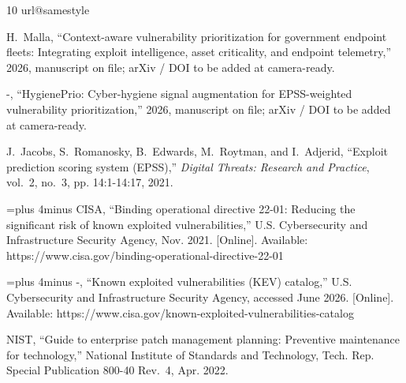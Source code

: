 \documentclass[journal]{IEEEtran}
\begin{document}
\begin{thebibliography}{10}
\providecommand{\url}[1]{#1}
\csname url@samestyle\endcsname
\providecommand{\newblock}{\relax}
\providecommand{\bibinfo}[2]{#2}
\providecommand{\BIBentrySTDinterwordspacing}{\spaceskip=0pt\relax}
\providecommand{\BIBentryALTinterwordstretchfactor}{4}
\providecommand{\BIBentryALTinterwordspacing}{\spaceskip=\fontdimen2\font plus
\BIBentryALTinterwordstretchfactor\fontdimen3\font minus
  \fontdimen4\font\relax}
\providecommand{\BIBforeignlanguage}[2]{{%
\expandafter\ifx\csname l@#1\endcsname\relax
\typeout{** WARNING: IEEEtran.bst: No hyphenation pattern has been}%
\typeout{** loaded for the language `#1'. Using the pattern for}%
\typeout{** the default language instead.}%
\else
\language=\csname l@#1\endcsname
\fi
#2}}
\providecommand{\BIBdecl}{\relax}
\BIBdecl

H.~Malla, ``Context-aware vulnerability prioritization for government endpoint
  fleets: Integrating exploit intelligence, asset criticality, and endpoint
  telemetry,'' 2026, manuscript on file; arXiv / DOI to be added at
  camera-ready.

-, ``{HygienePrio}: Cyber-hygiene signal augmentation for {EPSS}-weighted
  vulnerability prioritization,'' 2026, manuscript on file; arXiv / DOI to be
  added at camera-ready.

J.~Jacobs, S.~Romanosky, B.~Edwards, M.~Roytman, and I.~Adjerid, ``Exploit
  prediction scoring system ({EPSS}),'' \emph{Digital Threats: Research and
  Practice}, vol.~2, no.~3, pp. 14:1-14:17, 2021.

\BIBentryALTinterwordspacing
{CISA}, ``Binding operational directive 22-01: Reducing the significant risk of
  known exploited vulnerabilities,'' U.S. Cybersecurity and Infrastructure
  Security Agency, Nov. 2021. [Online]. Available:
  \url{https://www.cisa.gov/binding-operational-directive-22-01}
\BIBentrySTDinterwordspacing

\BIBentryALTinterwordspacing
-, ``Known exploited vulnerabilities ({KEV}) catalog,'' U.S. Cybersecurity
  and Infrastructure Security Agency, accessed June 2026. [Online]. Available:
  \url{https://www.cisa.gov/known-exploited-vulnerabilities-catalog}
\BIBentrySTDinterwordspacing

{NIST}, ``Guide to enterprise patch management planning: Preventive maintenance
  for technology,'' National Institute of Standards and Technology, Tech. Rep.
  Special Publication 800-40 Rev.~4, Apr. 2022.


\end{thebibliography}
\end{document}
